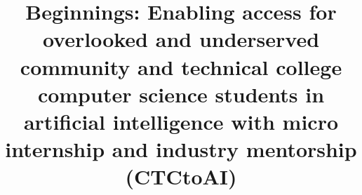 \title{Beginnings: Enabling access for overlooked and underserved community and technical college computer science students in artificial intelligence with micro internship and industry mentorship (CTCtoAI)}